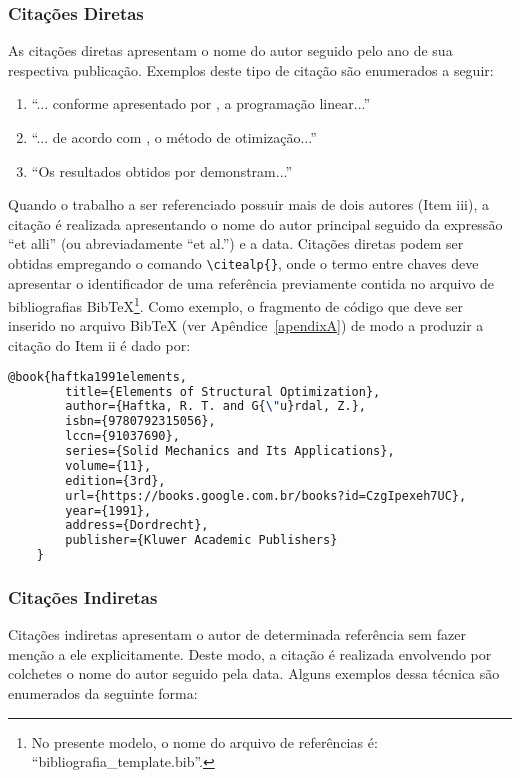 \subsubsection{Citações Diretas}

As citações diretas apresentam o nome do autor seguido pelo ano de sua respectiva publicação. Exemplos deste tipo de citação são enumerados a seguir:

\begin{enumerate}[label = {\roman*} - ,itemindent = 0.8 cm]
	\item ``... conforme apresentado por \citealp{dantzig1963linear}, a programação linear...''
	\item ``... de acordo com \citealp{haftka1991elements}, o método de otimização...''
	\item ``Os resultados obtidos por \citealp{deleon2015stress} demonstram...''
\end{enumerate}

Quando o trabalho a ser referenciado possuir mais de dois autores (Item iii), a citação é realizada apresentando o nome do autor principal seguido da expressão “et alli” (ou abreviadamente “et al.”) e a data. Citações diretas podem ser obtidas empregando o comando \verb|\citealp{}|, onde o termo entre chaves deve apresentar o identificador de uma referência previamente contida no arquivo de bibliografias BibTeX\footnote{No presente modelo, o nome do arquivo de referências é: ``bibliografia{\_}template.bib''.}. Como exemplo, o fragmento de código que deve ser inserido no arquivo BibTeX (ver Apêndice~\ref{apendixA}) de modo a produzir a citação do Item ii é dado por:

\begin{lstlisting}[language=TeX, frame=lines, lineskip={-0.75pt}, basicstyle=\scriptsize]
	@book{haftka1991elements,
		title={Elements of Structural Optimization},
		author={Haftka, R. T. and G{\"u}rdal, Z.},
		isbn={9780792315056},
		lccn={91037690},
		series={Solid Mechanics and Its Applications},
		volume={11},
		edition={3rd},
		url={https://books.google.com.br/books?id=CzgIpexeh7UC},
		year={1991},
		address={Dordrecht},
		publisher={Kluwer Academic Publishers}
	}
\end{lstlisting}

\subsubsection{Citações Indiretas}

Citações indiretas apresentam o autor de determinada referência sem fazer menção a ele explicitamente. Deste modo, a citação é realizada envolvendo por colchetes o nome do autor seguido pela data. Alguns exemplos dessa técnica são enumerados da seguinte forma:

